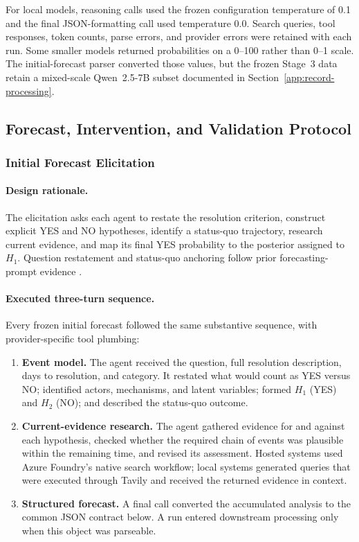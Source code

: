 For local models, reasoning calls used the frozen configuration temperature of 0.1 and
the final JSON-formatting call used temperature 0.0.  Search queries, tool responses,
token counts, parse errors, and provider errors were retained with each run.  Some
smaller models returned probabilities on a 0--100 rather than 0--1 scale.  The
initial-forecast parser converted those values, but the frozen Stage~3 data retain a
mixed-scale Qwen~2.5-7B subset documented in
Section~\ref{app:record-processing}.

\subsection{Forecast, Intervention, and Validation Protocol}
\label{app:exp1-protocol}

\subsubsection{Initial Forecast Elicitation}
\label{app:prompts}

\paragraph{Design rationale.}
The elicitation asks each agent to restate the resolution criterion, construct
explicit YES and NO hypotheses, identify a status-quo trajectory, research
current evidence, and map its final YES probability to the posterior assigned to
$H_1$. Question restatement and status-quo anchoring follow prior
forecasting-prompt evidence \citep{halawi2024approaching,wilson2025automated}.

\paragraph{Executed three-turn sequence.}
Every frozen initial forecast followed the same substantive sequence, with
provider-specific tool plumbing:

\begin{enumerate}
  \item \textbf{Event model.}  The agent received the question, full resolution
        description, days to resolution, and category.  It restated what would count
        as YES versus NO; identified actors, mechanisms, and latent variables; formed
        $H_1$ (YES) and $H_2$ (NO); and described the status-quo outcome.
  \item \textbf{Current-evidence research.}  The agent gathered evidence for and
        against each hypothesis, checked whether the required chain of events was
        plausible within the remaining time, and revised its assessment.  Hosted
        systems used Azure Foundry's native search workflow; local systems generated
        queries that were executed through Tavily and received the returned evidence
        in context.
  \item \textbf{Structured forecast.}  A final call converted the accumulated analysis
        to the common JSON contract below.  A run entered downstream processing only
        when this object was parseable.
\end{enumerate}


